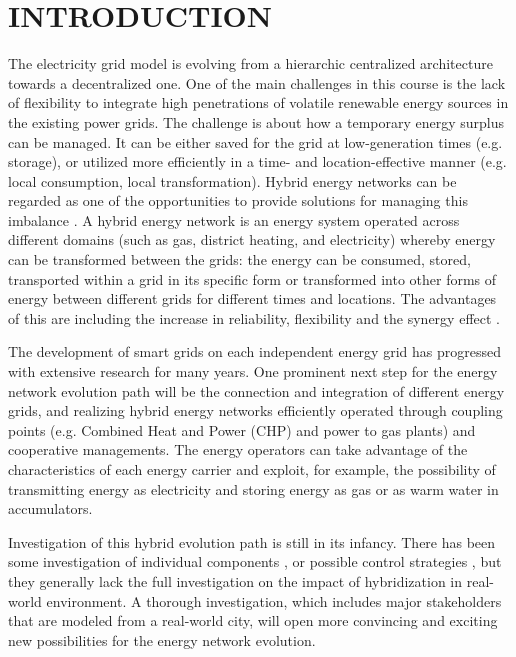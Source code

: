 \documentclass[a4paper,twoside]{article}
\begin{document}
\section{\uppercase{Introduction}}
The electricity grid model is evolving from a hierarchic centralized
architecture towards a decentralized one. One of the main challenges 
in this course is the lack of flexibility to integrate high
penetrations of volatile renewable energy sources in the existing
power grids.  
The challenge is about how a temporary energy surplus can be
managed. It can be either saved for the grid at low-generation 
times (e.g. storage), or utilized more efficiently in a time- and
location-effective manner (e.g. local consumption, local
transformation).   
Hybrid energy networks can be regarded as one of the opportunities to  
provide solutions for managing this imbalance \cite{appelrath_2012} \cite{lehnhoff2013ict}.  
A hybrid energy network is an energy system operated across
different domains (such as gas, district heating, and electricity)
whereby energy can be transformed between the grids: the energy can be
consumed, stored, transported within a grid in its specific form or
transformed into other forms of energy between different grids for
different times and locations. 
The advantages of this are including the increase in reliability,
flexibility and the synergy effect \cite{arnold_2011}.

The development of smart grids on each independent energy grid has
progressed with extensive research for many years. One prominent next
step for the energy network evolution path will be the connection and
integration of different energy grids, and realizing hybrid energy
networks efficiently operated through coupling points (e.g. Combined
Heat and Power (CHP) and power to gas plants) and cooperative
managements. 
The energy operators can take advantage of the characteristics of each  
energy carrier and exploit, for example, the possibility of
transmitting energy as electricity and storing energy as gas or as 
warm water in accumulators.  

Investigation of this hybrid evolution path is still in its
infancy. There has been some investigation of individual components
\cite{keirstead_2012} \cite{Derksen_2012}, or possible control
strategies \cite{arnold_2009}, but they generally lack the full
investigation on the impact of hybridization in real-world
environment. A thorough investigation, which includes major
stakeholders that are modeled from a real-world city, will open more
convincing and exciting new possibilities for the energy network
evolution.
\end{document}
